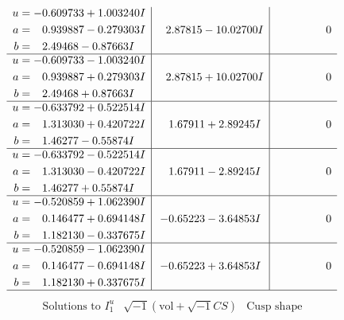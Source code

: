 \documentclass[1p]{elsarticle_modified}
\theoremstyle{definition}
\newcommand{\I}{\sqrt{-1}}
\begin{document}
$$\begin{array}{c|c|c}
\begin{aligned}
u &= -0.609733 + 1.003240 I \\
a &= \phantom{-}0.939887 - 0.279303 I \\
b &= \phantom{-}2.49468 - 0.87663 I\end{aligned}
 & \phantom{-}2.87815 - 10.02700 I & \phantom{-0.000000 } 0 \\ \hline\begin{aligned}
u &= -0.609733 - 1.003240 I \\
a &= \phantom{-}0.939887 + 0.279303 I \\
b &= \phantom{-}2.49468 + 0.87663 I\end{aligned}
 & \phantom{-}2.87815 + 10.02700 I & \phantom{-0.000000 } 0 \\ \hline\begin{aligned}
u &= -0.633792 + 0.522514 I \\
a &= \phantom{-}1.313030 + 0.420722 I \\
b &= \phantom{-}1.46277 - 0.55874 I\end{aligned}
 & \phantom{-}1.67911 + 2.89245 I & \phantom{-0.000000 } 0 \\ \hline\begin{aligned}
u &= -0.633792 - 0.522514 I \\
a &= \phantom{-}1.313030 - 0.420722 I \\
b &= \phantom{-}1.46277 + 0.55874 I\end{aligned}
 & \phantom{-}1.67911 - 2.89245 I & \phantom{-0.000000 } 0 \\ \hline\begin{aligned}
u &= -0.520859 + 1.062390 I \\
a &= \phantom{-}0.146477 + 0.694148 I \\
b &= \phantom{-}1.182130 - 0.337675 I\end{aligned}
 & -0.65223 - 3.64853 I & \phantom{-0.000000 } 0 \\ \hline\begin{aligned}
u &= -0.520859 - 1.062390 I \\
a &= \phantom{-}0.146477 - 0.694148 I \\
b &= \phantom{-}1.182130 + 0.337675 I\end{aligned}
 & -0.65223 + 3.64853 I & \phantom{-0.000000 } 0\\
 \hline 
 \end{array}$$\newpage$$\begin{array}{c|c|c}  
\text{Solutions to }I^u_{1}& \I (\text{vol} + \sqrt{-1}CS) & \text{Cusp shape}\\

\end{array}$$
\end{document}
